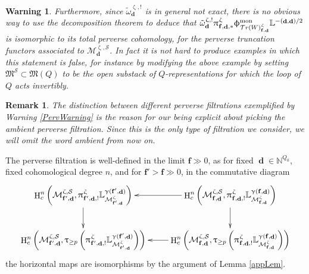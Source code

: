 \documentclass[a4paper,10pt]{amsart}
\renewcommand{\gamma}{\upgamma}
\renewcommand{\zeta}{\upzeta}
\renewcommand{\pi}{\uppi\hspace{0.05em}}
\renewcommand{\phi}{\upphi}
\renewcommand{\tau}{\uptau}
\newtheorem{warning}[theorem]{Warning}
\newtheorem{remark}[theorem]{Remark}
\newcommand{\ff}{\mathbf{f}}
\newcommand{\LL}{\mathbb{L}}
\newcommand{\SP}{\mathcal{S}}
\newcommand{\WW}{\mathcal{T}r(W)}
\newcommand{\Mst}{\mathfrak{M}}
\newcommand{\Msp}{\mathcal{M}}
\newcommand{\phim}[1]{\phi^{\mon}_{#1}}
\DeclareMathOperator{\mon}{mon}
\DeclareMathOperator{\dd}{\mathbf{d}}
\DeclareMathOperator{\HO}{H}
\begin{document}
\begin{warning}
Furthermore, since $\tilde{\omega}^{\zeta,!}_{\dd}$ is in general not exact, there is no obvious way to use the decomposition theorem to deduce that $\tilde{\omega}^{\zeta,!}_{\dd}\pi_{\ff,\dd,*}^{\zeta}\phim{\WW^{\zeta}_{\ff,\dd}}\LL^{-(\dd,\dd)/2}$ is isomorphic to its total perverse cohomology, for the perverse truncation functors associated to $\Msp_{\dd}^{\zeta,\SP}$.  In fact it is not hard to produce examples in which this statement is false, for instance by modifying the above example by setting $\Mst^{\SP}\subset \Mst(Q)$ to be the open substack of $Q$-representations for which the loop of $Q$ acts invertibly.
\end{warning}
\begin{remark}
The distinction between different perverse filtrations exemplified by Warning \ref{PervWarning} is the reason for our being explicit about picking the \textit{ambient} perverse filtration.  Since this is the only type of filtration we consider, we will omit the word ambient from now on.
\end{remark}
The perverse filtration is well-defined in the limit $\ff\gg0$, as for fixed $\dd\in\mathbb{N}^{Q_0}$, fixed cohomological degree $n$, and for $\ff'>\ff\gg 0$, in the commutative diagram
\[
\xymatrix{
\HO_c^n\left(\Msp_{\ff',\dd}^{\zeta,\SP},\pi ^{\zeta}_{\ff',\dd,!}\LL^{\gamma(\ff',\dd)}_{\Msp_{\ff',\dd}^{\zeta}}\right)\ar[d] &\HO_c^n\left(\Msp_{\ff,\dd }^{\zeta,\SP},\pi ^{\zeta}_{\ff,\dd ,!}\LL^{\gamma(\ff,\dd)}_{\Msp_{\ff,\dd }^{\zeta}}\right)\ar[l]\ar[d]\\
\HO_c^n\left(\Msp_{\ff',\dd}^{\zeta,\SP},\tau_{\geq p}\left(\pi ^{\zeta}_{\ff',\dd,!}\LL^{\gamma(\ff',\dd)}_{\Msp_{\ff',\dd}^{\zeta}}\right)\right)& \HO_c^n\left(\Msp_{\ff,\dd }^{\zeta,\SP},\tau_{\geq p}\left(\pi ^{\zeta}_{\ff,\dd ,!}\LL^{\gamma(\ff,\dd)}_{\Msp_{\ff,\dd }^{\zeta}}\right)\right)\ar[l],
}
\]
the horizontal maps are isomorphisms by the argument of Lemma \ref{appLem}.  
\end{document}
